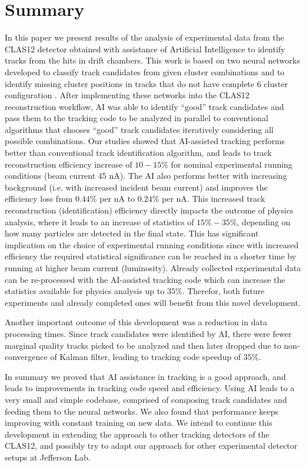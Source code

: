 \section{Summary}

In this paper we present results of the analysis of experimental data from the CLAS12 detector obtained with assistance of Artificial Intelligence
to identify tracks from the hits in drift chambers. This work is based on two neural networks developed to classify track candidates from
given cluster combinations \cite{Gavalian:2020oxg} and to identify missing cluster positions in tracks that do not have complete 6 cluster configuration \cite{Gavalian:2020xmc}. After implementing these networks into the CLAS12 reconstruction workflow, AI was able to identify ``good'' track candidates 
and pass them to the tracking code to be analyzed in parallel to conventional algorithms that chooses ``good'' track candidates iteratively considering all possible combinations. 
Our studies showed that AI-assisted tracking performs better than conventional track identification algorithm, and leads to track reconstruction efficiency increase of $10-15\%$ for nominal experimental running conditions (beam current 45 nA). The AI also performs better with increasing background (i.e. with increased incident beam current) and improves the efficiency loss from $0.44\%$ per nA to $0.24\%$ per nA.
This increased track reconstruction (identification) efficiency directly impacts the outcome of physics analysis, where it leads to an increase of statistics of 
$15\%-35\%$, depending on how many particles are detected in the final state. This has significant implication on  the choice of experimental running conditions since with increased efficiency the required statistical significance can be reached in a shorter time by running at higher beam current (luminosity). Already collected experimental data can be re-processed with the AI-assisted tracking
code which can increase the statistics available for physics analysis up to $35\%$. Therefor, both future experiments and already completed ones will benefit 
from this novel development.

Another important outcome of this development was a reduction in data processing times. Since track candidates were identified by AI, there were fewer marginal quality tracks picked to be analyzed and then later dropped due to non-convergence of Kalman filter, leading to tracking code speedup  of $35\%$.

In summary we proved that AI assistance in tracking is a good approach, and leads to improvements in tracking code speed and efficiency. 
Using AI leads to a very small and simple codebase, comprised of composing track candidates and feeding them to the neural networks. 
We also found that performance keeps improving with constant training on new data. We intend to continue this development in extending 
the approach to other tracking detectors of the CLAS12, and possibly try to adapt  our approach for other experimental detector setups at Jefferson Lab.

